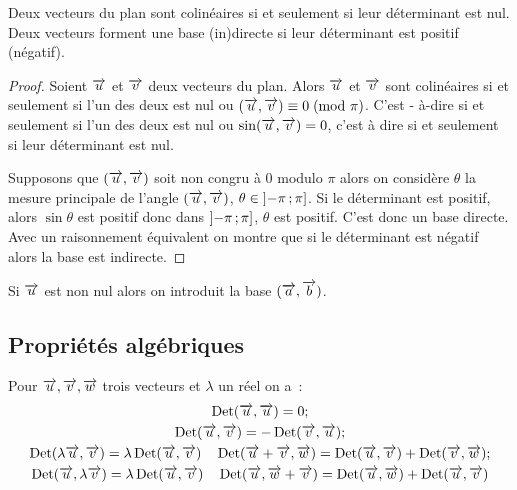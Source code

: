 \begin{prop}
    Deux vecteurs du plan sont colinéaires si et seulement si leur déterminant 
    est nul. Deux vecteurs forment une base (in)directe si leur déterminant est 
    positif (négatif).
\end{prop}

\begin{proof}
    Soient \(\vu\) et \(\vv\) deux vecteurs du plan. Alors \(\vu\) et \(\vv\) 
    sont colinéaires si et seulement si l'un des deux est nul ou 
    \(\congru{(\vu , \vv)}{0}{\pi}\). C'est - à-dire si et seulement si l'un des 
    deux est nul ou \( \sin(\vu , \vv) = 0\), c'est à dire si et seulement si leur 
    déterminant est nul.

    Supposons que \((\vu , \vv)\) soit non congru à 0 modulo \(\pi\) alors on 
    considère \(\theta\) la mesure principale de l'angle \((\vu , \vv)\), \(\theta 
    \in \intervalleof{-\pi}{\pi}\). Si le déterminant est positif, alors \(\sin 
    \theta\) est positif donc dans \(\intervalleof{-\pi}{\pi }\), \(\theta\) est 
    positif. C'est donc un base directe. Avec un raisonnement équivalent on 
    montre que si le déterminant est négatif alors la base est indirecte.
\end{proof}

Si \(\vu\) est non nul alors on introduit la base \((\vect{a},\vect{b})\).

\subsection{Propriétés algébriques}

\begin{prop}
    Pour \(\vu, \vv, \vw\) trois vecteurs et \(\lambda\) un réel on a~:
    \begin{gather}
        \Det(\vu , \vu) = 0;\\
        \Det(\vu, \vv) = -\Det(\vv, \vu);\\
        \Det( \lambda \vu, \vv) = \lambda \Det(\vu, \vv) \quad \Det(\vu+ \vv, 
        \vw) =\Det(\vu, \vv) + \Det(\vv, \vw);\\
        \Det(\vu, \lambda \vv) = \lambda \Det(\vu, \vv) \quad \Det(\vu, \vw + 
        \vv) =\Det(\vu, \vw) + \Det(\vu, \vv)
    \end{gather}
\end{prop}

